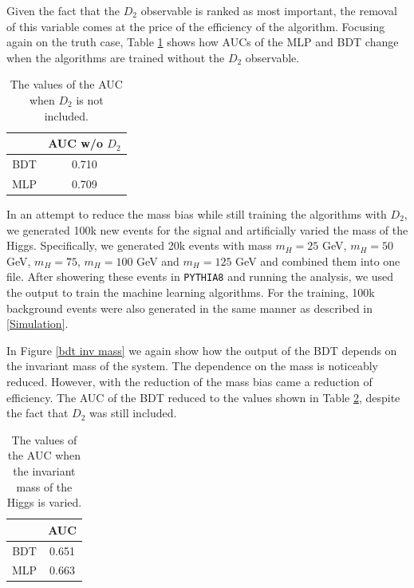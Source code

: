 \documentclass[10pt,a4paper]{book}
\def\code#1{\texttt{#1}}
\begin{document}
Given the fact that the $D_2$ observable is ranked as most important, the removal of this variable comes at the price of the efficiency of the algorithm. Focusing again on the truth case, Table \ref{AUC table no d2} shows how AUCs of the MLP and BDT change when the algorithms are trained without the $D_2$ observable.

\begin{table}[h!]
\centering
\begin{tabular}{|c|c|}
\hline 
\* & AUC w/o $D_2$ \\ 
\hline 
BDT &  0.710\\ 
\hline 
MLP &  0.709\\ 
\hline 
\end{tabular}
\caption{The values of the AUC when $D_2$ is not included.}
\label{AUC table no d2}
\end{table}

In an attempt to reduce the mass bias while still training the algorithms with $D_2$, we generated 100k new events for the signal and artificially varied the mass of the Higgs. Specifically, we generated 20k events with mass $m_H = 25$ GeV, $m_H = 50$ GeV, $m_H = 75$, $m_H = 100$ GeV and $m_H = 125$ GeV and combined them into one file. After showering these events in \code{PYTHIA8} and running the analysis, we used the output to train the machine learning algorithms. For the training, 100k background events were also generated in the same manner as described in \ref{Simulation}.

In Figure \ref{bdt inv mass} we again show how the output of the BDT depends on the invariant mass of the system. The dependence on the mass is noticeably reduced. However, with the reduction of the mass bias came a reduction of efficiency. The AUC of the BDT reduced to the values shown in Table \ref{AUC table mass bias}, despite the fact that $D_2$ was still included.

\begin{table}[h!]
\centering
\begin{tabular}{|c|c|}
\hline 
\* & AUC \\ 
\hline 
BDT & 0.651 \\ 
\hline 
MLP &  0.663\\ 
\hline 
\end{tabular}
\caption{The values of the AUC when the invariant mass of the Higgs is varied.}
\label{AUC table mass bias}
\end{table}
\end{document}
